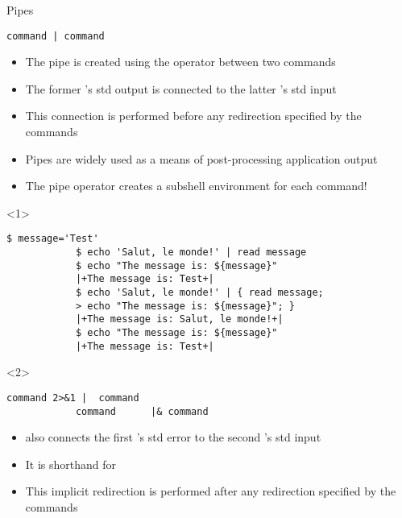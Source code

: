 \begin{frame}[fragile]{Pipes}
    \vspace{-3mm}
    \begin{lstlisting}[style=MyBash, numbers=none]
        command | command
    \end{lstlisting}
    \vspace{2mm}
    \begin{itemize}
        \item The pipe is created using the \PB{\texttt{|}} operator between two commands
        \item The former 's std output is connected to the latter 's std input
        \item This connection is performed before any redirection specified by the commands
        \item Pipes are widely used as a means of post-processing application output
        \item \alert{The pipe operator creates a subshell environment for each command!} 
    \end{itemize}
    \begin{onlyenv}<1>
        \begin{lstlisting}[style=MyBash, aboveskip=3mm]
            $ message='Test'
            $ echo 'Salut, le monde!' | read message
            $ echo "The message is: ${message}"
            |+The message is: Test+|
            $ echo 'Salut, le monde!' | { read message;
            > echo "The message is: ${message}"; }
            |+The message is: Salut, le monde!+|
            $ echo "The message is: ${message}"
            |+The message is: Test+|
        \end{lstlisting}
    \end{onlyenv}
    \begin{onlyenv}<2>
        \begin{lstlisting}[style=MyBash, numbers=none, aboveskip=3mm]
            command 2>&1 |  command
            command      |& command
        \end{lstlisting}
        \vspace{2mm}
        \begin{itemize}
            \item \PB{\texttt{|\&}} also connects the first 's std error to the second 's std input
            \item It is shorthand for 
            \item This implicit redirection is performed after any redirection specified by the commands
        \end{itemize}
    \end{onlyenv}
\end{frame}
